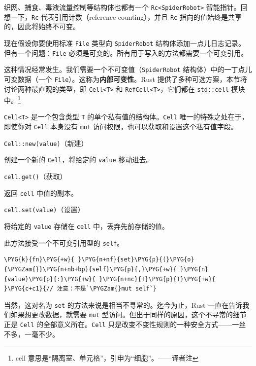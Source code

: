 织网、捕食、毒液流量控制等结构体也都有一个 \texttt{Rc<SpiderRobot>} 智能指针。回想一下，\texttt{Rc} 代表引用计数（reference counting），并且 \texttt{Rc} 指向的值始终是共享的，因此将始终不可变。

现在假设你要使用标准 \texttt{File} 类型向 \texttt{SpiderRobot} 结构体添加一点儿日志记录。但有一个问题：\texttt{File} 必须是可变的。所有用于写入的方法都需要一个可变引用。

这种情况经常发生。我们需要一个不可变值（\texttt{SpiderRobot} 结构体）中的一丁点儿可变数据（一个 \texttt{File}）。这称为\textbf{内部可变性}。Rust 提供了多种可选方案，本节将讨论两种最直观的类型，即 \texttt{Cell<T>} 和 \texttt{RefCell<T>}，它们都在 \texttt{std::cell} 模块中。\footnote{cell 意思是“隔离室、单元格”，引申为“细胞”。——译者注}

\texttt{Cell<T>} 是一个包含类型 \texttt{T} 的单个私有值的结构体。\texttt{Cell} 唯一的特殊之处在于，即使你对 \texttt{Cell} 本身没有 \texttt{mut} 访问权限，也可以获取和设置这个私有值字段。

\begin{mySidenote}
\texttt{Cell::new(value)}（新建）
\end{mySidenote}

创建一个新的 \texttt{Cell}，将给定的 \texttt{value} 移动进去。

\begin{mySidenote}
\texttt{cell.get()}（获取）
\end{mySidenote}

返回 \texttt{cell} 中值的副本。

\begin{mySidenote}
\texttt{cell.set(value)}（设置）
\end{mySidenote}

将给定的 \texttt{value} 存储在 \texttt{cell} 中，丢弃先前存储的值。

此方法接受一个不可变引用型的 \texttt{self}。

\begin{Verbatim}[commandchars=\\\{\},breaklines=true,breakanywhere=true,fontsize=\codefont,xleftmargin=17bp]
\PYG{k}{fn}\PYG{+w}{ }\PYG{n+nf}{set}\PYG{p}{(}\PYG{o}{\PYGZam{}}\PYG{n+nb+bp}{self}\PYG{p}{,}\PYG{+w}{ }\PYG{n}{value}\PYG{p}{:}\PYG{+w}{ }\PYG{n+nc}{T}\PYG{p}{)}\PYG{+w}{    }\PYG{c+c1}{// 注意：不是`\PYGZam{}mut self`}
\end{Verbatim}

当然，这对名为 \texttt{set} 的方法来说是相当不寻常的。迄今为止，Rust 一直在告诉我们如果想更改数据，就需要 \texttt{mut} 型访问。但出于同样的原因，这个不寻常的细节正是 \texttt{Cell} 的全部意义所在。\texttt{Cell} 只是改变不变性规则的一种安全方式——一丝不多，一毫不少。

